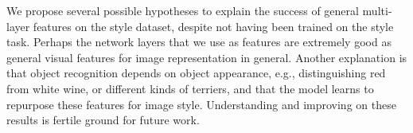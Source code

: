 We propose several possible hypotheses to explain the success of general multi-layer features on the style dataset, despite not having been trained on the style task.
Perhaps the network layers that we use as features are extremely good as general visual features for image representation in general.
Another explanation is that object recognition depends on object appearance, e.g., distinguishing red from white wine, or different kinds of terriers, and that the model learns to repurpose these features for image style.
Understanding and improving on these results is fertile ground for future work.

